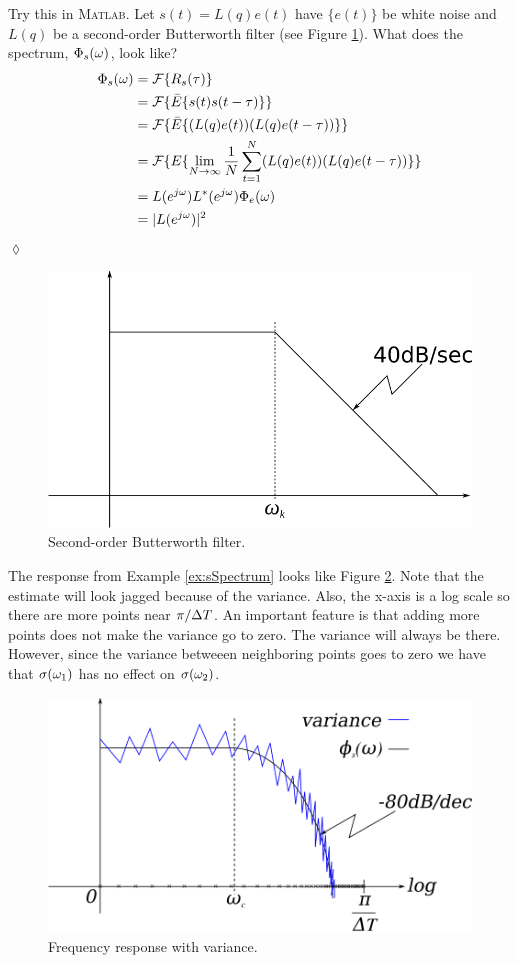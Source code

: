 \begin{example}
\label{ex:sSpectrum}
Try this in \textsc{Matlab}. Let $s(t)=L(q)e(t)$ have $\{e(t)\}$ be white noise and $L(q)$ be a second-order Butterworth filter (see Figure \ref{fig:06butterworthFilter}). What does the spectrum, $\Phi_s(\omega)$, look like?
\begin{align*}
\Phi_s(\omega) &= \mathcal{F}\{R_s(\tau)\} \\
&= \mathcal{F}\{\bar{E}\{s(t)s(t-\tau)\}\} \\
&= \mathcal{F}\{\bar{E}\{(L(q)e(t))(L(q)e(t-\tau))\}\} \\
&= \mathcal{F}\{E\{\lim_{N\to\infty}\frac{1}{N}\sum_{t=1}^N(L(q)e(t))(L(q)e(t-\tau))\}\} \\
&= L(e^{j\omega})L^*(e^{j\omega})\Phi_e(\omega) \\
&= |L(e^{j\omega})|^2
\end{align*}
$\lozenge$
\end{example}

\begin{figure}[ht!]
	\centering
	\includegraphics[width=.4\textwidth]{images/06butterworthFilter}
	\caption{Second-order Butterworth filter.}
	\label{fig:06butterworthFilter}
\end{figure}

The response from Example \ref{ex:sSpectrum} looks like Figure \ref{fig:06freqResp}. Note that the estimate will look jagged because of the variance. Also, the x-axis is a log scale so there are more points near $\pi/\Delta T$. An important feature is that adding more points does not make the variance go to zero. The variance will always be there. However, since the variance betweeen neighboring points goes to zero we have that $\sigma(\omega_1)$ has no effect on $\sigma(\omega_2)$.

\begin{figure}[ht!]
	\centering
	\includegraphics[width=.5\textwidth]{images/06freqResp}
	\caption{Frequency response with variance.}
	\label{fig:06freqResp}
\end{figure}

